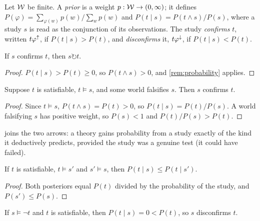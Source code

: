 \begin{definition}\label{def:confirm}
Let $\mathcal W$ be finite. A \emph{prior} is a weight $p:\mathcal W\to(0,\infty)$; it defines
$P(\varphi)=\sum_{\varphi(w)}p(w)\big/\sum_{w}p(w)$ and
$P(t\mid s)=P(t\wedge s)/P(s)$, where a study $s$ is read as the conjunction of its observations.
The study \emph{confirms} $t$, written $t\varphi^{{\uparrow}}$, if $P(t\mid s)>P(t)$, and
\emph{disconfirms} it, $t\varphi^{{\downarrow}}$, if $P(t\mid s)<P(t)$.
\end{definition}

\begin{proposition}\label{prop:confsupp}
If $s$ confirms $t$, then $s\circlearrowright t$.
\end{proposition}

\begin{proof}
$P(t\mid s)>P(t)\ge0$, so $P(t\wedge s)>0$, and \cref{rem:probability} applies.
\end{proof}

\begin{theorem}\label{thm:hd}
Suppose $t$ is satisfiable, $t\models s$, and some world falsifies $s$. Then $s$ confirms $t$.
\end{theorem}

\begin{proof}
Since $t\models s$, $P(t\wedge s)=P(t)>0$, so $P(t\mid s)=P(t)/P(s)$. A world falsifying $s$ has
positive weight, so $P(s)<1$ and $P(t)/P(s)>P(t)$.
\end{proof}

 joins the two arrows: a theory gains probability from a study exactly of the kind it
deductively predicts, provided the study was a genuine test (it could have failed).

\begin{proposition}\label{prop:ascend}
If $t$ is satisfiable, $t\models s'$ and $s'\models s$, then $P(t\mid s)\le P(t\mid s')$.
\end{proposition}

\begin{proof}
Both posteriors equal $P(t)$ divided by the probability of the study, and $P(s')\le P(s)$.
\end{proof}

\begin{proposition}\label{prop:qpopper}
If $s\models\neg t$ and $t$ is satisfiable, then $P(t\mid s)=0<P(t)$, so $s$ disconfirms $t$.
\end{proposition}

